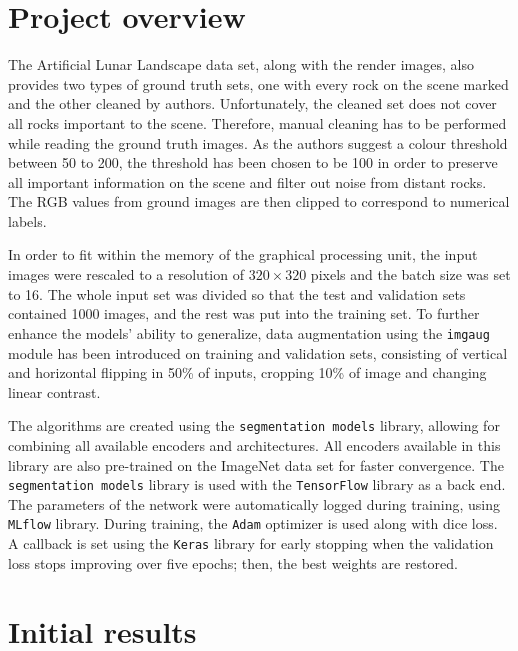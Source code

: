 \documentclass[a4paper,twoside,12pt]{book}
\begin{document}
\section{Project overview}
\label{sec:chapter3.1}
The Artificial Lunar Landscape data set, along with the render images, also provides two types of ground truth sets, one with every rock on the scene marked and the other cleaned by authors. Unfortunately, the cleaned set does not cover all rocks important to the scene. Therefore, manual cleaning has to be performed while reading the ground truth images. As the authors suggest a colour threshold between 50 to 200, the threshold has been chosen to be 100 in order to preserve all important information on the scene and filter out noise from distant rocks. The RGB values from ground images are then clipped to correspond to numerical labels.  %


In order to fit within the memory of the graphical processing unit, the input images were rescaled to a resolution of $320 \times 320$ pixels and the batch size was set to 16. The whole input set was divided so that the test and validation sets contained 1000 images, and the rest was put into the training set. To further enhance the models' ability to generalize, data augmentation using the \texttt{imgaug} module has been introduced on training and validation sets, consisting of vertical and horizontal flipping in 50\% of inputs, cropping 10\% of image and changing linear contrast.

The algorithms are created using the \texttt{segmentation models} library, allowing for combining all available encoders and architectures. All encoders available in this library are also pre-trained on the ImageNet data set for faster convergence. The \texttt{segmentation models} library is used with the \texttt{TensorFlow} library as a back end. The parameters of the network were automatically logged during training, using \texttt{MLflow} library. During training, the \texttt{Adam} optimizer is used along with dice loss. A callback is set using the \texttt{Keras} library for early stopping when the validation loss stops improving over five epochs; then, the best weights are restored.

\section{Initial results}
\label{sec:chapter3.2}
\end{document}
